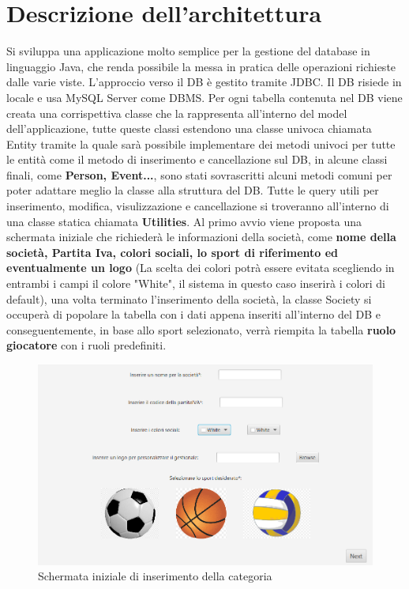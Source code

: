 \documentclass[a4paper,12pt]{report}
\begin{document}
\section{Descrizione dell'architettura}
Si sviluppa una applicazione molto semplice per la gestione del database in linguaggio Java, che renda 
possibile la messa in pratica delle operazioni richieste dalle varie viste. L’approccio verso il DB è gestito 
tramite JDBC. Il DB risiede in locale e usa MySQL Server come DBMS.  
Per ogni tabella contenuta nel DB viene creata una corrispettiva classe che la rappresenta all’interno del 
model dell’applicazione, tutte queste classi estendono una classe univoca chiamata Entity tramite la quale
sarà possibile implementare dei metodi univoci per tutte le entità come il metodo di inserimento e cancellazione sul DB,
in alcune classi finali, come \textbf{Person, Event...}, sono stati sovrascritti alcuni metodi comuni per poter adattare
meglio la classe alla struttura del DB.
Tutte le query utili per inserimento, modifica, visulizzazione e cancellazione si troveranno all'interno di una classe
statica chiamata \textbf{Utilities}.
Al primo avvio viene proposta una schermata iniziale che richiederà le informazioni della società, come
\textbf{nome della società, Partita Iva, colori sociali, lo sport di riferimento ed eventualmente un logo} (La scelta dei colori
potrà essere evitata scegliendo in entrambi i campi il colore "White", il sistema in questo caso inserirà i colori di default),
una volta terminato l'inserimento della società, la classe Society si occuperà di popolare la tabella con i dati appena inseriti
all'interno del DB e conseguentemente, in base allo sport selezionato, verrà riempita la tabella \textbf{ruolo giocatore} con i ruoli predefiniti.
\begin{figure}[htp]
    \centering
    \includegraphics[width = \textwidth]{GSS_report/img/schermata_iniziale.png}
    \caption{Schermata iniziale di inserimento della categoria}
    \label{fig:umlAnalisys}
\end{figure}
\end{document}
